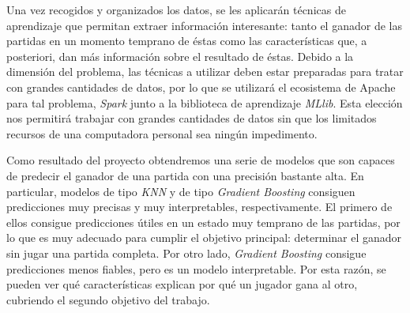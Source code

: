 Una vez recogidos y organizados los datos, se les aplicarán técnicas de
aprendizaje que permitan extraer información interesante: tanto el ganador
de las partidas en un momento temprano de éstas como las características que,
a posteriori, dan más información sobre el resultado de éstas. Debido a la
dimensión del problema, las técnicas a utilizar deben estar preparadas para
tratar con grandes cantidades de datos, por lo que se utilizará el ecosistema
de Apache para tal problema, \emph{Spark} junto a la biblioteca de aprendizaje
\emph{MLlib}. Esta elección nos permitirá trabajar con grandes cantidades de
datos sin que los limitados recursos de una computadora personal sea ningún
impedimento.


Como resultado del proyecto obtendremos una serie de modelos que son capaces
de predecir el ganador de una partida con una precisión bastante
alta. En particular, modelos de tipo \emph{KNN} y de tipo \emph{Gradient Boosting}
consiguen predicciones muy precisas y muy interpretables, respectivamente.
El primero de ellos consigue predicciones útiles en un estado muy temprano
de las partidas, por lo que es muy adecuado para cumplir el objetivo principal:
determinar el ganador sin jugar una partida completa.
Por otro lado, \emph{Gradient Boosting} consigue predicciones menos fiables,
pero es un modelo interpretable. Por esta razón, se pueden ver qué
características explican por qué un jugador gana al otro, cubriendo el
segundo objetivo del trabajo.




